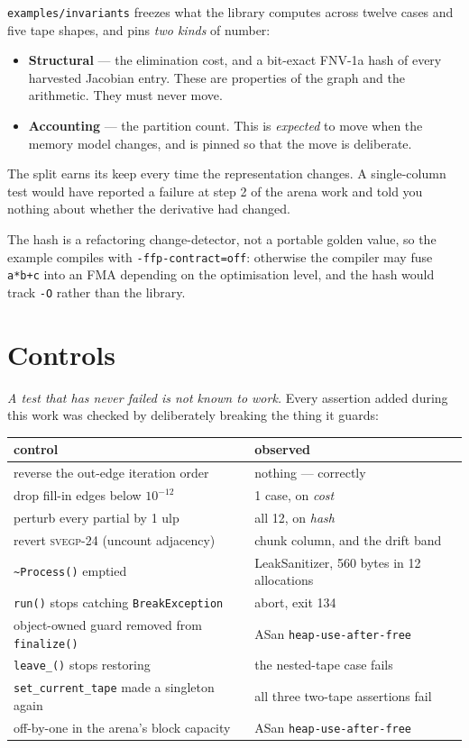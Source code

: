 \documentclass[11pt,a4paper]{report}
\newcommand{\svegp}[1]{\textsc{svegp-#1}}
\newcommand{\code}[1]{\texttt{#1}}
\begin{document}
\code{examples/invariants} freezes what the library computes across twelve cases
and five tape shapes, and pins \emph{two kinds} of number:

\begin{itemize}
\item \textbf{Structural} --- the elimination cost, and a bit-exact FNV-1a hash
      of every harvested Jacobian entry. These are properties of the graph and
      the arithmetic. They must never move.
\item \textbf{Accounting} --- the partition count. This is \emph{expected} to
      move when the memory model changes, and is pinned so that the move is
      deliberate.
\end{itemize}

The split earns its keep every time the representation changes. A single-column
test would have reported a failure at step 2 of the arena work and told you
nothing about whether the derivative had changed.

The hash is a refactoring change-detector, not a portable golden value, so the
example compiles with \code{-ffp-contract=off}: otherwise the compiler may fuse
\code{a*b+c} into an FMA depending on the optimisation level, and the hash would
track \code{-O} rather than the library.

\section{Controls}

\emph{A test that has never failed is not known to work.} Every assertion added
during this work was checked by deliberately breaking the thing it guards:

\begin{center}
\begin{longtable}{@{}p{7.2cm}p{7.2cm}@{}}
\toprule
control & observed \\
\midrule
\endhead
reverse the out-edge iteration order & nothing --- correctly \\
drop fill-in edges below $10^{-12}$ & 1 case, on \emph{cost} \\
perturb every partial by 1 ulp & all 12, on \emph{hash} \\
revert \svegp{24} (uncount adjacency) & chunk column, and the drift band \\
\code{\textasciitilde Process()} emptied & LeakSanitizer, 560 bytes in 12 allocations \\
\code{run()} stops catching \code{BreakException} & abort, exit 134 \\
object-owned guard removed from \code{finalize()} & ASan \code{heap-use-after-free} \\
\code{leave\_()} stops restoring & the nested-tape case fails \\
\code{set\_current\_tape} made a singleton again & all three two-tape assertions fail \\
off-by-one in the arena's block capacity & ASan \code{heap-use-after-free} \\
\bottomrule
\end{longtable}
\end{center}
\end{document}
